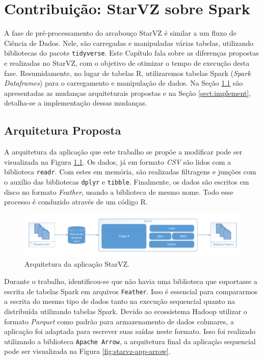 \chapter{Contribuição: StarVZ sobre Spark} \label{ch:contribution}

A fase de pré-processamento do arcabouço StarVZ é similar a um fluxo de Ciência 
de Dados. Nele, são carregadas e manipuladas várias tabelas, utilizando 
bibliotecas do pacote \texttt{tidyverse}. Este Capítulo fala sobre as diferenças 
propostas e realizadas no StarVZ, com o objetivo de otimizar o tempo de 
execução desta fase. Resumidamente, no lugar de tabelas R, utilizaremos tabelas
Spark (\emph{Spark Dataframes}) para o carregamento e manipulação de dados.
Na Seção \ref{sect:arch} são apresentadas as mudanças 
arquiteturais propostas e na Seção \ref{sect:implement}, detalha-se a 
implementação dessas mudanças.

\section{Arquitetura Proposta} \label{sect:arch}

A arquitetura da aplicação que este trabalho se propõe a modificar pode ser 
visualizada na Figura \ref{fig:starvz-app}. Os dados, já em formato 
\textit{CSV} são lidos com a biblioteca \texttt{readr}. Com estes em memória, 
são realizadas filtragens e junções com o auxílio das bibliotecas \texttt{dplyr} 
e \texttt{tibble}. Finalmente, os dados são escritos em disco no formato 
\textit{Feather}, usando a biblioteca de mesmo nome. Todo esse processo é 
conduzido através de um código R.

\begin{figure}[ht]
 \centerline{\includegraphics[width=1\textwidth]{./img/starvz-arch.pdf}}
 \caption{Arquitetura da aplicação StarVZ.}
 \label{fig:starvz-app}
\end{figure}

Durante o trabalho, identificou-se que não havia uma biblioteca que suportasse a 
escrita de tabelas Spark em arquivos \texttt{Feather}. Isso é essencial para 
compararmos a escrita do mesmo tipo de dados tanto na execução sequencial quanto 
na distribuída utilizando tabelas Spark. Devido ao ecossistema Hadoop utilizar 
o formato \textit{Parquet} \cite{ref:parquet} como padrão para armazenamento de 
dados colunares, a aplicação foi adaptada para escrever suas saídas neste 
formato. Isso foi realizado utilizando a biblioteca \texttt{Apache Arrow}, a 
arquitetura final da aplicação sequencial pode ser visualizada na Figura 
\ref{fig:starvz-app-arrow}. 

